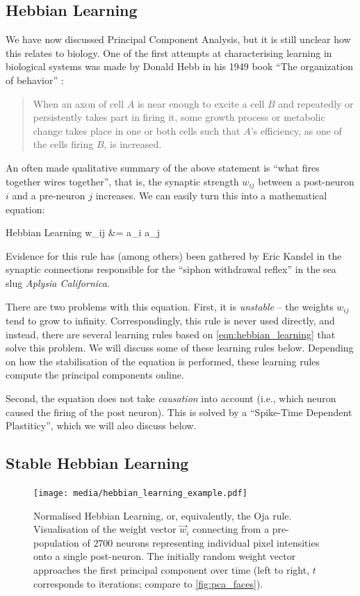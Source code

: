 \documentclass[10pt,letterpaper,oneside]{article}
\begin{document}
\subsection{Hebbian Learning}

We have now discussed Principal Component Analysis, but it is still unclear how this relates to biology.
One of the first attempts at characterising learning in biological systems was made by Donald Hebb in his 1949 book \enquote{The organization of behavior} \cite{hebb1949organization}:
\begin{quotation}
	When an axon of cell $A$ is near enough to excite a cell $B$ and repeatedly or persistently takes part in firing it, some growth process or metabolic change takes place in one or both cells such that $A$'s efficiency, as one of the cells firing $B$, is increased.
\end{quotation}
An often made qualitative summary of the above statement is \enquote{what fires together wires together}, that is, the synaptic strength $w_{ij}$ between a post-neuron $i$ and a pre-neuron $j$ increases. We can easily turn this into a mathematical equation:
\begin{ImportantEqn}{Hebbian Learning}
	\Delta w_{ij} &= \eta a_i a_j
	\label{eqn:hebbian_learning}
\end{ImportantEqn}
Evidence for this rule has (among others) been gathered by Eric Kandel in the synaptic connections responsible for the \enquote{siphon withdrawal reflex} in the sea slug \emph{Aplysia Californica}.

There are two problems with this equation. First, it is \emph{unstable} -- the weights $w_{ij}$ tend to grow to infinity. Correspondingly, this rule is never used directly, and instead, there are several learning rules based on \cref{eqn:hebbian_learning} that solve this problem. We will discuss some of these learning rules below. Depending on how the stabilisation of the equation is performed, these learning rules compute the principal components online.

Second, the equation does not take \emph{causation} into account (i.e., which neuron caused the firing of the post neuron). This is solved by a \enquote{Spike-Time Dependent Plastiticy}, which we will also discuss below.

\subsection{Stable Hebbian Learning}

\begin{figure}
	\centering
	\texttt{[image: media/hebbian\_learning\_example.pdf]}
	\caption{Normalised Hebbian Learning, or, equivalently, the Oja rule. Visualisation of the weight vector $\vec w_i$ connecting from a pre-population of $2700$ neurons representing individual pixel intensities onto a single post-neuron. The initially random weight vector approaches the first principal component over time (left to right, $t$ corresponds to iterations; compare to \cref{fig:pca_faces}). }
	\label{fig:hebbian_learning_example}
\end{figure}
\end{document}
